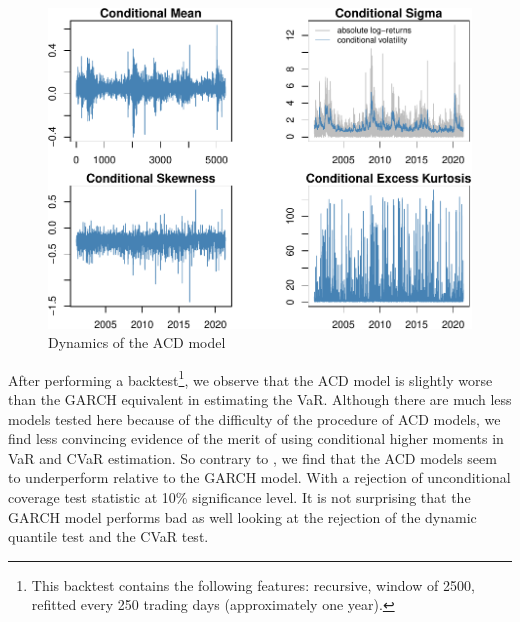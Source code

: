 \documentclass[a4paper, nobind]{templates/ociamthesis}
\begin{document}
\begin{figure}[h]

{\centering \includegraphics{_main_files/figure-latex/figureACDmoments-1} 

}

\caption{Dynamics of the ACD model}\label{fig:figureACDmoments}
\end{figure}

\newpage

\noindent After performing a backtest\footnote{This backtest contains the following features: recursive, window of 2500, refitted every 250 trading days (approximately one year).}, we observe that the ACD model is slightly worse than the GARCH equivalent in estimating the VaR. Although there are much less models tested here because of the difficulty of the procedure of ACD models, we find less convincing evidence of the merit of using conditional higher moments in VaR and CVaR estimation. So contrary to \textcite{bali2008}, we find that the ACD models seem to underperform relative to the GARCH model. With a rejection of unconditional coverage test statistic at 10\% significance level. It is not surprising that the GARCH model performs bad as well looking at the rejection of the dynamic quantile test and the CVaR test.

\newpage
\end{document}

